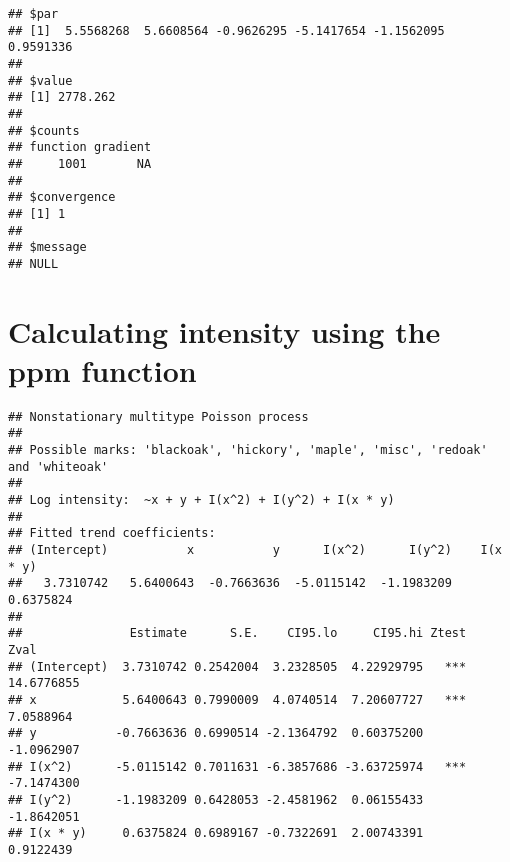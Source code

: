 \documentclass[]{article}
\newenvironment{Shaded}{\begin{snugshade}}{\end{snugshade}}
\newcommand{\DataTypeTok}[1]{\textcolor[rgb]{0.13,0.29,0.53}{#1}}
\newcommand{\DecValTok}[1]{\textcolor[rgb]{0.00,0.00,0.81}{#1}}
\newcommand{\KeywordTok}[1]{\textcolor[rgb]{0.13,0.29,0.53}{\textbf{#1}}}
\newcommand{\NormalTok}[1]{#1}
\newcommand{\OperatorTok}[1]{\textcolor[rgb]{0.81,0.36,0.00}{\textbf{#1}}}
\newcommand{\StringTok}[1]{\textcolor[rgb]{0.31,0.60,0.02}{#1}}
\begin{document}
\begin{verbatim}
## $par
## [1]  5.5568268  5.6608564 -0.9626295 -5.1417654 -1.1562095  0.9591336
## 
## $value
## [1] 2778.262
## 
## $counts
## function gradient 
##     1001       NA 
## 
## $convergence
## [1] 1
## 
## $message
## NULL
\end{verbatim}

\hypertarget{calculating-intensity-using-the-ppm-function}{%
\section{Calculating intensity using the ppm
function}\label{calculating-intensity-using-the-ppm-function}}

\begin{Shaded}
\end{Shaded}

\begin{verbatim}
## Nonstationary multitype Poisson process
## 
## Possible marks: 'blackoak', 'hickory', 'maple', 'misc', 'redoak' and 'whiteoak'
## 
## Log intensity:  ~x + y + I(x^2) + I(y^2) + I(x * y)
## 
## Fitted trend coefficients:
## (Intercept)           x           y      I(x^2)      I(y^2)    I(x * y) 
##   3.7310742   5.6400643  -0.7663636  -5.0115142  -1.1983209   0.6375824 
## 
##               Estimate      S.E.    CI95.lo     CI95.hi Ztest       Zval
## (Intercept)  3.7310742 0.2542004  3.2328505  4.22929795   *** 14.6776855
## x            5.6400643 0.7990009  4.0740514  7.20607727   ***  7.0588964
## y           -0.7663636 0.6990514 -2.1364792  0.60375200       -1.0962907
## I(x^2)      -5.0115142 0.7011631 -6.3857686 -3.63725974   *** -7.1474300
## I(y^2)      -1.1983209 0.6428053 -2.4581962  0.06155433       -1.8642051
## I(x * y)     0.6375824 0.6989167 -0.7322691  2.00743391        0.9122439
\end{verbatim}
\end{document}
